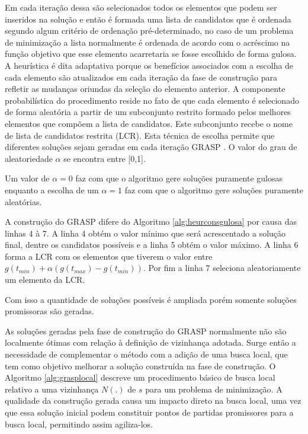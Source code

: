 Em cada iteração dessa são selecionados todos os elementos que podem ser inseridos na solução e então é formada uma lista de candidatos que é ordenada segundo algum critério de ordenação pré-determinado, no caso de um problema de minimização a lista normalmente é ordenada de acordo com o acréscimo na função objetivo que esse elemento acarretaria se fosse escolhido de forma gulosa. A heurística
é dita adaptativa porque os benefícios associados com a escolha de cada elemento são atualizados em cada iteração da fase de construção para refletir as mudanças oriundas da seleção do elemento anterior. A componente probabilística do procedimento reside no fato
de que cada elemento é selecionado de forma aleatória a partir de um subconjunto restrito formado pelos melhores elementos que compõem a lista de candidatos. Este subconjunto recebe o nome de lista de candidatos restrita (LCR). Esta técnica de escolha permite que
diferentes soluções sejam geradas em cada iteração GRASP \cite{notasmarcone}. O valor do grau de aleatoriedade $\alpha$ se encontra entre [0,1].

Um valor de $\alpha = 0$ faz com que o algoritmo gere soluções puramente gulosas enquanto a escolha de um $\alpha = 1$ faz com que o algoritmo gere soluções puramente aleatórias.
 
A construção do GRASP difere do Algoritmo \ref{alg:heurconsgulosa} por causa das linhas 4 à 7. A linha 4 obtém o valor mínimo que será acrescentado a solução final, dentre os candidatos possíveis e a linha 5 obtém o valor máximo. A linha 6 forma a LCR com os elementos que tiverem o valor entre $g(t_{min}) + \alpha(g(t_{max}) - g(t_{min}))$. Por fim a linha 7 seleciona aleatoriamente um elemento da LCR.

Com isso a quantidade de soluções possíveis é ampliada porém somente soluções promissoras são geradas.

As soluções geradas pela fase de construção do GRASP normalmente não são localmente ótimas com relação à definição de vizinhança adotada. Surge então a necessidade de complementar o método com a adição de uma busca local, que tem como objetivo melhorar a solução construída na fase de construção. O Algoritmo \ref{alg:grasplocal} descreve um procedimento básico de busca local relativo a uma vizinhança $N(.)$ de $s$ para um problema de minimização. A qualidade da construção gerada causa um impacto direto na busca local, uma vez que essa solução inicial podem constituir pontos de partidas promissores para a busca local, permitindo assim agiliza-los.

